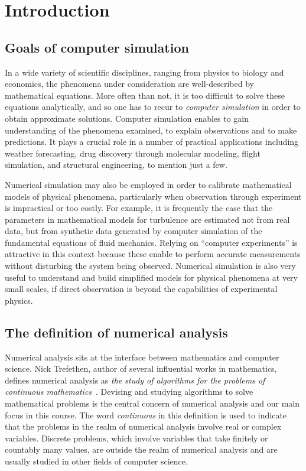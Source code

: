 \chapter*{Introduction}%

\section*{Goals of computer simulation}%
\label{sec:goals_of_computer_simulation}

In a wide variety of scientific disciplines,
ranging from physics to biology and economics,
the phenomena under consideration are well-described by mathematical equations.
More often than not,
it is too difficult to solve these equations analytically,
and so one has to recur to \emph{computer simulation} in order to obtain approximate solutions.
Computer simulation enables to gain understanding of the phenomena examined,
to explain observations and to make predictions.
It plays a crucial role in a number of practical applications including
weather forecasting, drug discovery through molecular modeling,
flight simulation, and structural engineering, to mention just a few.

Numerical simulation may also be employed in order to calibrate mathematical models of physical phenomena,
particularly when observation through experiment is impractical or too costly.
For example, it is frequently the case that the parameters in mathematical models for turbulence are estimated not from real data,
but from synthetic data generated by computer simulation of the fundamental equations of fluid mechanics.
Relying on ``computer experiments'' is attractive in this context because
these enable to perform accurate measurements without disturbing the system being observed.
Numerical simulation is also very useful to understand and build simplified models for physical phenomena at very small scales,
if direct observation is beyond the capabilities of experimental physics.

\section*{The definition of numerical analysis}
Numerical analysis sits at the interface between mathematics and computer science.
Nick Trefethen,
author of several influential works in mathematics,
defines numerical analysis as \emph{the study of algorithms for the problems of continuous mathematics}~\cite{trefethen1992definition}.
Devising and studying algorithms to solve mathematical problems is the central concern of numerical analysis
and our main focus in this course.
The word \emph{continuous} in this definition is used to indicate that
the problems in the realm of numerical analysis involve real or complex variables.
Discrete problems, which involve variables that take finitely or countably many values,
are outside the realm of numerical analysis and are usually studied in other fields of computer science.

